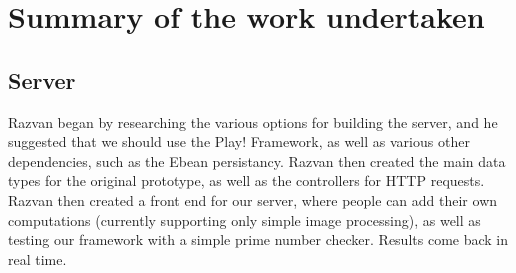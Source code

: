 \documentclass[a4paper,10pt]{article}
\begin{document}

\section{Summary of the work undertaken}

\subsection{Server}


Razvan began by researching the various options for building the server, and he suggested that we should use the Play! Framework, as well as various other dependencies, such as the Ebean persistancy. Razvan then created the main data types for the original prototype, as well as the controllers for HTTP requests. 
Razvan then created a front end for our server, where people can add their own computations (currently supporting only simple image processing), as well as testing our framework with a simple  prime number checker. Results come back in real time.
\end{document}
